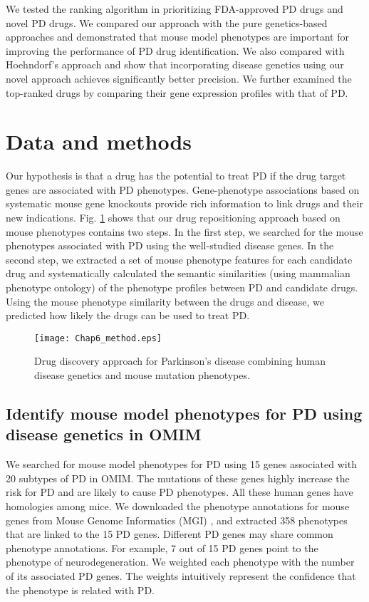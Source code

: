 We tested the ranking algorithm in prioritizing FDA-approved PD drugs and novel PD drugs. We compared our approach with the pure genetics-based approaches \cite{wang2013rational,okada2014genetics} and demonstrated that mouse model phenotypes are important for improving the performance of PD drug identification. We also compared with Hoehndorf's approach \cite{hoehndorf2012linking} and show that incorporating disease genetics using our novel approach achieves significantly better precision. We further examined the top-ranked drugs by comparing their gene expression profiles with that of PD.

\section{Data and methods}
Our hypothesis is that a drug has the potential to treat PD if the drug target genes
are associated with PD phenotypes. Gene-phenotype associations based on systematic
mouse gene knockouts provide rich information to link drugs and their new indications.
Fig. \ref{mphen} shows that our drug repositioning approach based on mouse phenotypes
contains two steps. In the first step, we searched for the mouse phenotypes associated with
PD using the well-studied disease genes. In the second step, we extracted a set of mouse
phenotype features for each candidate drug and systematically calculated the semantic similarities
(using mammalian phenotype ontology) of the phenotype profiles between PD and candidate drugs.
Using the mouse phenotype similarity between the drugs and disease,
we predicted how likely the drugs can be used to treat PD.
  \begin{figure}[h!]
  \begin{center}
\texttt{[image: Chap6\_method.eps]}
\end{center}
  \caption{Drug discovery approach for Parkinson’s disease combining human disease genetics and mouse mutation phenotypes. }\label{mphen}
  \end{figure}

  \subsection{Identify mouse model phenotypes for PD using disease genetics in OMIM }
We searched for mouse model phenotypes for PD using 15 genes associated with 20 subtypes of PD in OMIM.
The mutations of these genes highly increase the risk for PD and are likely to cause PD phenotypes.
All these human genes have homologies among mice. We downloaded the phenotype annotations for mouse genes
from Mouse Genome Informatics (MGI) \cite{eppig2015mouse}, and extracted 358 phenotypes that are linked to the 15 PD genes.
Different PD genes may share common phenotype annotations.
For example, 7 out of 15 PD genes point to the phenotype of neurodegeneration.
We weighted each phenotype with the number of its associated PD genes.
The weights intuitively represent the confidence that the phenotype is related with PD.

